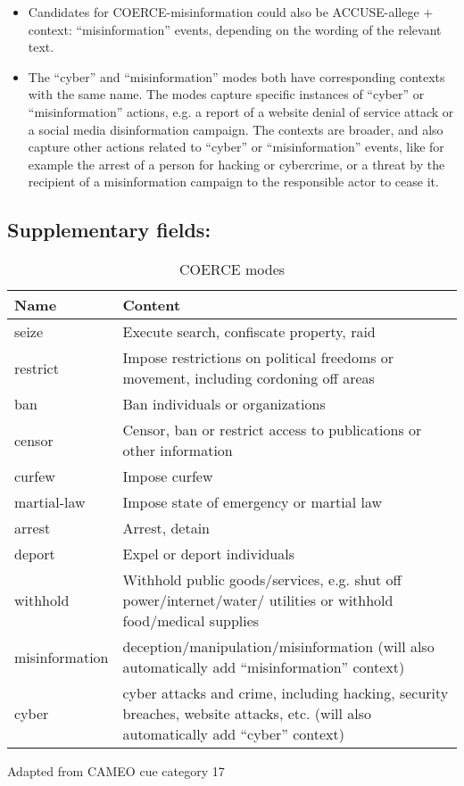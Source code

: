 \documentclass[11pt]{report}
\begin{document}
\begin{itemize}
\item Candidates for COERCE-misinformation could also be ACCUSE-allege + context: ``misinformation'' events, depending on the wording of the relevant text.
\item The ``cyber'' and ``misinformation'' modes both have corresponding contexts with the same name. The modes capture specific instances of ``cyber'' or ``misinformation'' actions, e.g. a report of a website denial of service attack or a social media disinformation campaign. The contexts are broader, and also capture other actions related to ``cyber'' or ``misinformation'' events, like for example the arrest of a person for hacking or cybercrime, or a threat by the recipient of a misinformation campaign to the responsible actor to cease it.
\end{itemize}

\subsection{Supplementary fields: }

\begin{table}[htp]
\caption{COERCE modes}
\begin{center}
\begin{tabular}{|p{}|L{.73\textwidth}|}
\hline
Name & Content \\
\hline
seize & Execute search, confiscate property, raid \\
restrict & Impose restrictions on political freedoms or movement, including cordoning off areas \\
ban & Ban individuals or organizations \\
censor & Censor, ban or restrict access to publications or other information  \\
curfew & Impose curfew \\
martial-law & Impose state of emergency or martial law \\
arrest & Arrest, detain  \\
deport & Expel or deport individuals \\
withhold & Withhold public goods/services, e.g. shut off power/internet/water/ utilities or withhold food/medical supplies \\
misinformation & deception/manipulation/misinformation (will also automatically add ``misinformation'' context) \\
cyber & cyber attacks and crime, including hacking, security breaches, website attacks, etc. (will also automatically add ``cyber'' context) \\
\hline
\end{tabular}
\end{center}
\label{tab:coerce}
Adapted from CAMEO cue category 17
\end{table}%
\end{document}

